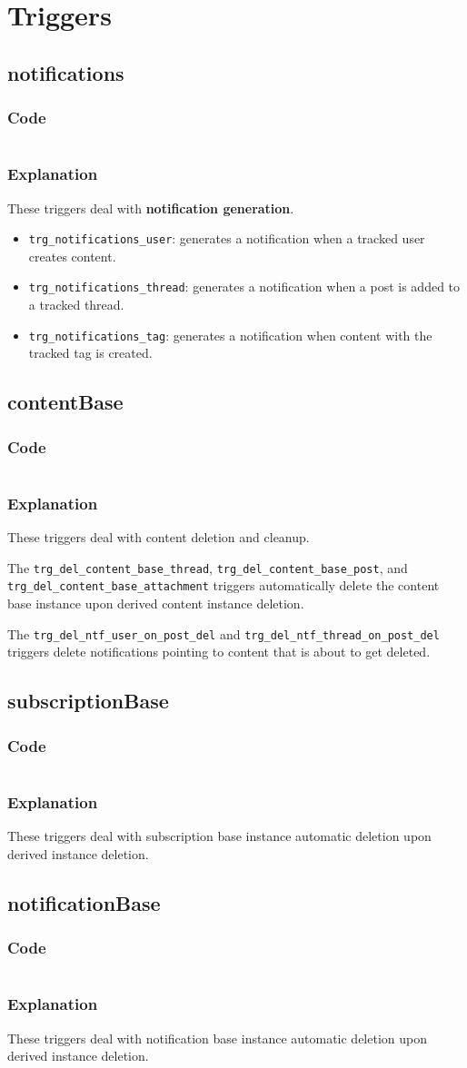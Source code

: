 \documentclass[12pt]{report}
\renewcommand\emph{\textbf}
\newcommand{\printSQLtest}[1]
{
    \inputminted[linenos, breaklines, breakbytoken, tabsize=4, fontsize=\footnotesize]{mysql}{#1}
}
\newcommand{\printSQLTablepage}[2]
{    
    \subsection{#2}
    \subsubsection{Code}
    \printSQLtest{../sql/parts/#1}
    \subsubsection{Explanation}
}
\begin{document}
                \newpage

            \section{Triggers}

                \printSQLTablepage{90_trgNotifications.sql}{notifications}
                    These triggers deal with \emph{notification generation}.

                    \begin{itemize}
                        \item \texttt{trg_notifications_user}: generates a notification when a tracked user creates content.
                        \item \texttt{trg_notifications_thread}: generates a notification when a post is added to a tracked thread.
                        \item \texttt{trg_notifications_tag}: generates a notification when content with the tracked tag is created.
                    \end{itemize}

                \newpage

                \printSQLTablepage{91_trgDelContentBase.sql}{contentBase}
                    These triggers deal with content deletion and cleanup.

                    The \texttt{trg_del_content_base_thread}, \texttt{trg_del_content_base_post}, and \texttt{trg_del_content_base_attachment} triggers automatically delete the content base instance upon derived content instance deletion.

                    The \texttt{trg_del_ntf_user_on_post_del} and \texttt{trg_del_ntf_thread_on_post_del} triggers delete notifications pointing to content that is about to get deleted.

                \newpage

                \printSQLTablepage{92_trgDelSubscriptionBase.sql}{subscriptionBase}
                    These triggers deal with subscription base instance automatic deletion upon derived instance deletion.

                \newpage

                \printSQLTablepage{93_trgDelNotificationBase.sql}{notificationBase}
                     These triggers deal with notification base instance automatic deletion upon derived instance deletion.
\end{document}
